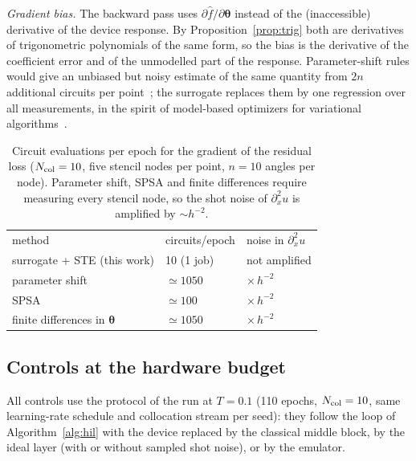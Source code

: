 \documentclass[floatfix,aps,pra,twocolumn,superscriptaddress,10pt,nofootinbib]{revtex4-2}
\newcommand{\Ncol}{N_{\rm col}}
\newcounter{algorithm}
\begin{document}
\begin{appendices}
\emph{Gradient bias.} The backward pass uses $\partial\hat f/\partial\bm\theta$ instead of the (inaccessible) derivative of the device response. By Proposition~\ref{prop:trig} both are derivatives of trigonometric polynomials of the same form, so the bias is the derivative of the coefficient error and of the unmodelled part of the response. Parameter-shift rules would give an unbiased but noisy estimate of the same quantity from $2n$ additional circuits per point~\cite{schuld2019evaluating,wierichs2022general}; the surrogate replaces them by one regression over all measurements, in the spirit of model-based optimizers for variational algorithms~\cite{sung2020using,nakanishi2020sequential,ostaszewski2021structure}.

\begin{table}[b]
\caption{\justifying Circuit evaluations per epoch for the gradient of the residual loss ($\Ncol=10$, five stencil nodes per point, $n=10$ angles per node). Parameter shift, SPSA and finite differences require measuring every stencil node, so the shot noise of $\partial_x^2u$ is amplified by $\sim h^{-2}$.}
\label{tab:cost}
\setlength{\tabcolsep}{2pt}
\footnotesize
\begin{ruledtabular}
\begin{tabular}{lll}
method & circuits/epoch & noise in $\partial_x^2u$\\
\colrule
surrogate + STE (this work) & 10 (1 job) & not amplified\\
parameter shift & $\simeq1050$ & $\times\,h^{-2}$\\
SPSA & $\simeq100$ & $\times\,h^{-2}$\\
finite differences in $\bm\theta$ & $\simeq1050$ & $\times\,h^{-2}$\\
\end{tabular}
\end{ruledtabular}
\end{table}

\subsection{Controls at the hardware budget}\label{app:controls}
All controls use the protocol of the run at $T=0.1$ (110 epochs, $\Ncol=10$, same learning-rate schedule and collocation stream per seed): they follow the loop of Algorithm~\ref{alg:hil} with the device replaced by the classical middle block, by the ideal layer (with or without sampled shot noise), or by the emulator.


\end{appendices}
\end{document}
